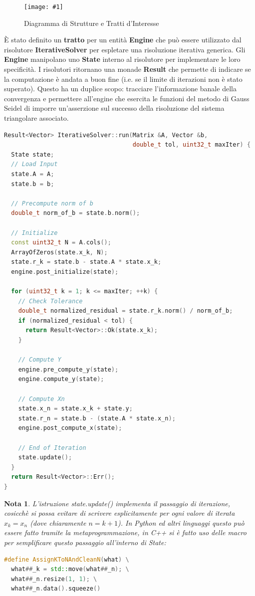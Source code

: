 \documentclass[a4paper,11pt,oneside, table]{article}
\newtheorem{nota}{Nota}
\newcommand{\putimagebig}[3] {
	\begin{figure}[H]
	    \centering
	    \texttt{[image: \#1]}
	    \caption{#2}\label{#3}
	\end{figure}
}
\begin{document}
\putimagebig{images/diagram.png}{Diagramma di Strutture e Tratti d'Interesse}{png:diagram_of_structures}

\`E stato definito un \textbf{tratto} per un entit\`a \textbf{Engine} che pu\`o essere utilizzato dal risolutore \textbf{IterativeSolver} per espletare una risoluzione iterativa generica. Gli \textbf{Engine} manipolano uno \textbf{State} interno al risolutore per implementare le loro specificit\`a. I risolutori ritornano una monade \textbf{Result} che permette di indicare se la computazione \`e andata a buon fine (i.e. se il limite di iterazioni non \`e stato superato). Questo ha un duplice scopo: tracciare l'informazione banale della convergenza e permettere all'engine che esercita le funzioni del metodo di Gauss Seidel di imporre un'asserzione sul successo della risoluzione del sistema triangolare associato.

\begin{lstlisting}[language=C++]
Result<Vector> IterativeSolver::run(Matrix &A, Vector &b,
                                    double_t tol, uint32_t maxIter) {
  State state;
  // Load Input
  state.A = A;
  state.b = b;

  // Precompute norm of b
  double_t norm_of_b = state.b.norm();

  // Initialize
  const uint32_t N = A.cols();
  ArrayOfZeros(state.x_k, N);
  state.r_k = state.b - state.A * state.x_k;
  engine.post_initialize(state);

  for (uint32_t k = 1; k <= maxIter; ++k) {
    // Check Tolerance
    double_t normalized_residual = state.r_k.norm() / norm_of_b;
    if (normalized_residual < tol) {
      return Result<Vector>::Ok(state.x_k);
    }

    // Compute Y
    engine.pre_compute_y(state);
    engine.compute_y(state);

    // Compute Xn
    state.x_n = state.x_k + state.y;
    state.r_n = state.b - (state.A * state.x_n);
    engine.post_compute_x(state);

    // End of Iteration
    state.update();
  } 
  return Result<Vector>::Err();
}
\end{lstlisting}

\begin{nota}
L'istruzione \textit{state.update()} implementa il passaggio di iterazione, cosicch\`e si possa evitare di scrivere esplicitamente per ogni valore di iterata $x_k = x_n$ (dove chiaramente $n = k+1$). In Python ed altri linguaggi questo pu\`o essere fatto tramite la metaprogrammazione, in C++ si \`e fatto uso delle macro per semplificare questo passaggio all'interno di \textit{State}:


\begin{lstlisting}[language=C++]
#define AssignKToNAndCleanN(what) \
  what##_k = std::move(what##_n); \
  what##_n.resize(1, 1); \
  what##_n.data().squeeze()
\end{lstlisting}
\end{nota}
\end{document}
